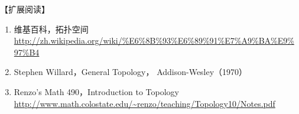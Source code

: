 【扩展阅读】

\begin{enumerate}
	\item 维基百科，拓扑空间\url{http://zh.wikipedia.org/wiki/\%E6\%8B\%93\%E6\%89\%91\%E7\%A9\%BA\%E9\%97\%B4}
	
	\item Stephen Willard，General Topology， Addison-Wesley（1970）
	
	\item Renzo’s Math 490，Introduction to Topology  \url{http://www.math.colostate.edu/~renzo/teaching/Topology10/Notes.pdf}
\end{enumerate}

